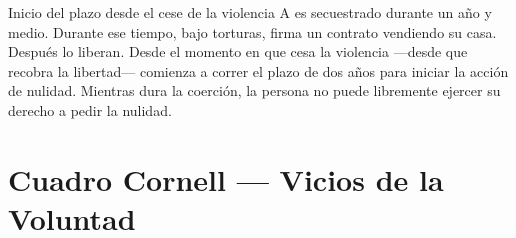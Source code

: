 \documentclass[12pt,oneside]{book}
\begin{document}
\begin{example}{Inicio del plazo desde el cese de la violencia}
A es secuestrado durante un año y medio. Durante ese tiempo, bajo torturas, firma un contrato vendiendo su casa. Después lo liberan. Desde el momento en que cesa la violencia ---desde que recobra la libertad--- comienza a correr el plazo de dos años para iniciar la acción de nulidad. Mientras dura la coerción, la persona no puede libremente ejercer su derecho a pedir la nulidad.
\end{example}

\chapter{Cuadro Cornell --- Vicios de la Voluntad}
\end{document}
